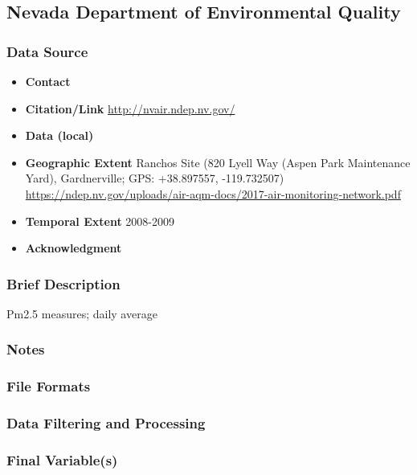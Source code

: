 \subsection{Nevada Department of Environmental Quality}

\subsubsection*{Data Source}

\begin{itemize}[nolistsep]
\item \textbf{Contact} 
\item \textbf{Citation/Link} \url{http://nvair.ndep.nv.gov/}
\item \textbf{Data (local)} 
\item \textbf{Geographic Extent} Ranchos Site (820 Lyell Way (Aspen Park Maintenance Yard), Gardnerville; GPS: +38.897557, -119.732507) \url{https://ndep.nv.gov/uploads/air-aqm-docs/2017-air-monitoring-network.pdf }
\item \textbf{Temporal Extent} 2008-2009
\item \textbf{Acknowledgment} 
\end{itemize}

\subsubsection*{Brief Description}
Pm2.5 measures; daily average


\subsubsection*{Notes}

\subsubsection*{File Formats} 

\subsubsection*{Data Filtering and Processing}

\subsubsection*{Final Variable(s)}

